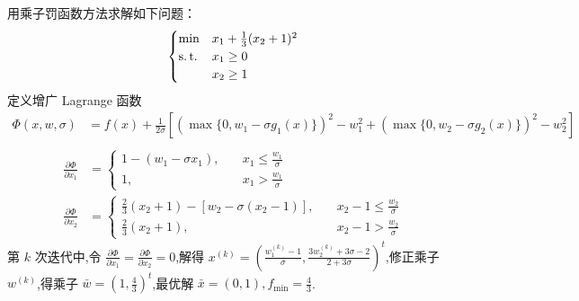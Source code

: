 \begin{problem}
    用乘子罚函数方法求解如下问题：\[\begin{cases}
        \min &x_1 + \frac{1}{3}(x_2 + 1)^2\\
        \operatorname{s.t.} &x_1 \ge 0\\
        &x_2 \ge 1
    \end{cases}\]
    \Answer 定义增广 Lagrange 函数
    \begin{align*}
        \Phi(x, w, \sigma) &= f(x) + \frac{1}{2\sigma}\left[(\max\{0, w_1 - \sigma g_1(x)\})^2 - w_1^2 + (\max\{0, w_2 - \sigma g_2(x)\})^2 - w_2^2\right]\\
    \end{align*}
    \begin{align*}
        \frac{\partial \Phi}{\partial x_1} &= \begin{cases}
            1 - (w_1 - \sigma x_1), \quad &x_1 \le \frac{w_1}{\sigma}\\
            1, \quad &x_1 > \frac{w_1}{\sigma}
        \end{cases}\\
        \frac{\partial \Phi}{\partial x_2} &= \begin{cases}
            \frac{2}{3}(x_2 + 1) - \left[w_2 - \sigma(x_2 - 1)\right], \quad &x_2 - 1 \le \frac{w_2}{\sigma}\\
            \frac{2}{3}(x_2 + 1), \quad &x_2 - 1 > \frac{w_2}{\sigma}
        \end{cases}
    \end{align*}
    第 $k$ 次迭代中,令 $\frac{\partial \Phi}{\partial x_1} = \frac{\partial \Phi}{\partial x_2} = 0$,解得 $x^{(k)} = (\frac{w_1^{(k)} - 1}{\sigma}, \frac{3w_2^{(k)} + 3\sigma - 2}{2 + 3\sigma})^t$,修正乘子 $w^{(k)}$,得乘子 $\bar{w} = (1, \frac{4}{3})^t$,最优解 $\bar{x} = (0, 1), f_{\min} = \frac{4}{3}$.
\end{problem}

